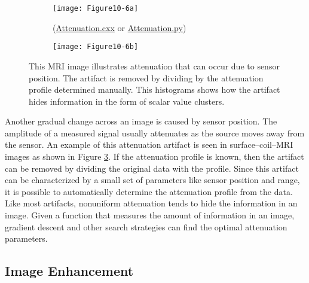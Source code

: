 \begin{figure}[htb]
	\begin{subfigure}[h]{0.96\linewidth}
		\texttt{[image: Figure10-6a]}
		\captionsetup{justification=centering}
		\caption*{(\href{https://lorensen.github.io/VTKExamples/site/Cxx/ImageProcessing/Attenuation/}{Attenuation.cxx} or \href{https://lorensen.github.io/VTKExamples/site/Python/ImageProcessing/Attenuation/}{Attenuation.py})} 
		\label{fig:Figure10-6a}
	\end{subfigure}
	\hfill
	\begin{subfigure}[h]{0.96\linewidth}
		\texttt{[image: Figure10-6b]}
		\captionsetup{justification=centering}
		\caption*{}
		\label{fig:Figure10-6b}
	\end{subfigure}
	\caption{This MRI image illustrates attenuation that can occur due to sensor position. The artifact is removed by dividing by the attenuation profile determined manually. This histograms shows how the artifact hides information in the form of scalar value clusters.}\label{fig:Figure10-6}
\end{figure}

Another gradual change across an image is caused by sensor position. The amplitude of a measured signal usually attenuates as the source moves away from the sensor. An example of this attenuation artifact is seen in surface--coil--MRI images as shown in Figure \ref{fig:Figure10-6}. If the attenuation profile is known, then the artifact can be removed by dividing the original data with the profile. Since this artifact can be characterized by a small set of parameters like sensor position and range, it is possible to automatically determine the attenuation profile from the data. Like most artifacts, nonuniform attenuation tends to hide the information in an image. Given a function that measures the amount of information in an image, gradient descent and other search strategies can find the optimal attenuation parameters.

\subsection{Image Enhancement}

